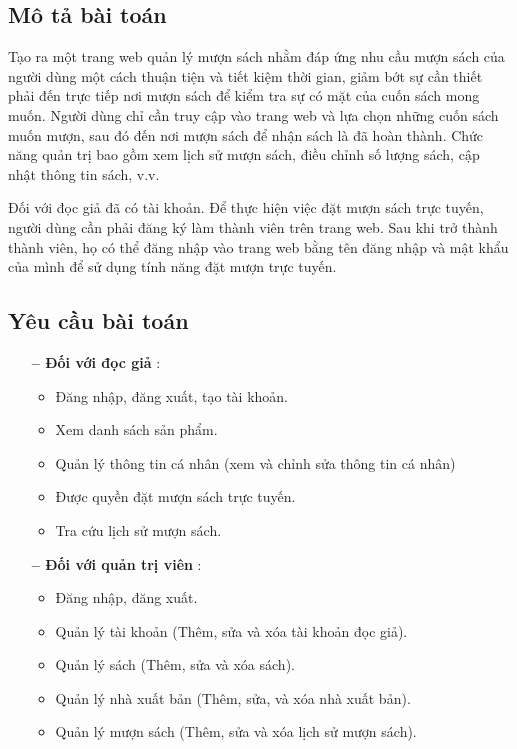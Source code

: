 {}
\setcounter{section}{2}
\setcounter{subsection}{0}


\subsection{Mô tả bài toán}
Tạo ra một trang web quản lý mượn sách nhằm đáp ứng nhu cầu mượn sách của người dùng một cách thuận tiện và tiết kiệm thời gian, giảm bớt sự cần thiết phải đến trực tiếp nơi mượn sách để kiểm tra sự có mặt của cuốn sách mong muốn. Người dùng chỉ cần truy cập vào trang web và lựa chọn những cuốn sách muốn mượn, sau đó đến nơi mượn sách để nhận sách là đã hoàn thành. Chức năng quản trị bao gồm xem lịch sử mượn sách, điều chỉnh số lượng sách, cập nhật thông tin sách, v.v.
\par
Đối với đọc giả đã có tài khoản. Để thực hiện việc đặt mượn sách trực tuyến, người dùng cần phải đăng ký làm thành viên trên trang web. Sau khi trở thành thành viên, họ có thể đăng nhập vào trang web bằng tên đăng nhập và mật khẩu của mình để sử dụng tính năng đặt mượn trực tuyến.


\subsection{Yêu cầu bài toán}

\begin{itemize}[align=left, leftmargin=2cm]
  \item[\textbf{-- Đối với đọc giả}]:
        \begin{itemize}[label={+}]
          \item Đăng nhập, đăng xuất, tạo tài khoản.
          \item Xem danh sách sản phẩm.
          \item Quản lý thông tin cá nhân (xem và chỉnh sửa thông tin cá nhân)
          \item Được quyền đặt mượn sách trực tuyến.
          \item Tra cứu lịch sử mượn sách.
        \end{itemize}
  \item[\textbf{-- Đối với quản trị viên}]:
        \begin{itemize}[label={+}]
          \item Đăng nhập, đăng xuất.
          \item Quản lý tài khoản (Thêm, sửa và xóa tài khoản đọc giả).
          \item Quản lý sách (Thêm, sửa và xóa sách).
          \item Quản lý nhà xuất bản (Thêm, sửa, và xóa nhà xuất bản).
          \item Quản lý mượn sách (Thêm, sửa và xóa lịch sử mượn sách).
        \end{itemize}
\end{itemize}

